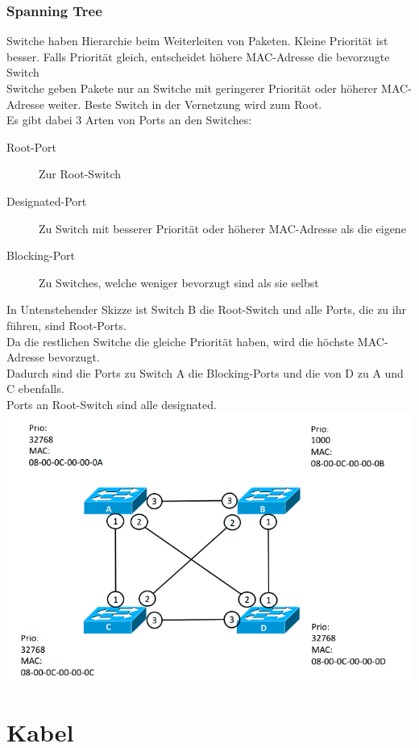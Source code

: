 \documentclass[12pt,a4paper]{article}
\begin{document}
			\subsubsection{Spanning Tree}
				Switche haben Hierarchie beim Weiterleiten von Paketen. Kleine Priorität ist besser. Falls Priorität gleich, entscheidet höhere MAC-Adresse die bevorzugte Switch\\
				Switche geben Pakete nur an Switche mit geringerer Priorität oder höherer MAC-Adresse weiter. Beste Switch in der Vernetzung wird zum Root.\\
				Es gibt dabei 3 Arten von Ports an den Switches:
				\begin{description}
					\item[Root-Port] Zur Root-Switch
					\item[Designated-Port] Zu Switch mit besserer Priorität oder höherer MAC-Adresse als die eigene
					\item[Blocking-Port] Zu Switches, welche weniger bevorzugt sind als sie selbst 
				\end{description}
				In Untenstehender Skizze ist Switch B die Root-Switch und alle Ports, die zu ihr führen, sind Root-Ports.\\
				Da die restlichen Switche die gleiche Priorität haben, wird die höchste MAC-Adresse bevorzugt. \\
				Dadurch sind die Ports zu Switch A die Blocking-Ports und die von D zu A und C ebenfalls. \\
				Ports an Root-Switch sind alle designated.\\
				\includegraphics[scale=0.5]{Bilder/RouterVermascht.png}

	\section{Kabel}
\end{document}
